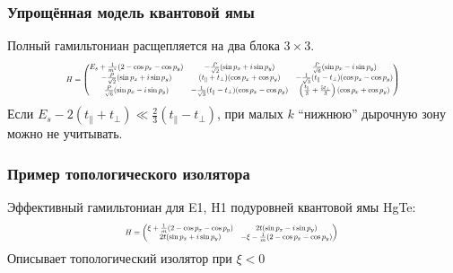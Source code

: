 \documentclass{beamer}
\begin{document}
\begin{frame}
    \frametitle{Упрощённая модель квантовой ямы}
    Полный гамильтониан расщепляется на два блока $3\times 3$.
    \begin{equation}
        \scalebox{0.6}{$
        \label{block}
        H = \begin{pmatrix}
                E_s + \frac{1}{m^*}(2 - \cos{p_x} - \cos{p_y}) &
                -\frac{P}{\sqrt{2}}(\sin{p_x} + i\sin{p_y}) &
                \frac{P}{\sqrt{6}}(\sin{p_x} - i\sin{p_y}) \\
                -\frac{P}{\sqrt{2}}(\sin{p_x} + i\sin{p_y}) &
                (t_\parallel + t_\perp)(\cos{p_x} + \cos{p_y}) &
                -\frac{1}{\sqrt{3}}(t_\parallel - t_\perp)(\cos{p_x} - \cos{p_y}) \\
                \frac{P}{\sqrt{6}}(\sin{p_x} - i\sin{p_y}) &
                -\frac{1}{\sqrt{3}}(t_\parallel - t_\perp)(\cos{p_x} - \cos{p_y}) &
                \left(\frac{t_\parallel}{3} + \frac{5t_\perp}{3}\right)(\cos{p_x} + \cos{p_y})
            \end{pmatrix}
        $}
    \end{equation}
Если $E_s - 2(t_\parallel + t_\perp) \ll \frac{2}{3}(t_\parallel - t_\perp)$,
при малых $k$ ``нижнюю'' дырочную зону можно не учитывать. 
\end{frame}
\begin{frame}
    \frametitle{Пример топологического изолятора}
        Эффективный гамильтониан для E1, H1 подуровней квантовой ямы HgTe:
        \begin{equation}
           \label{eff_so_ham}
            \scalebox{0.6}{%
            $
            H = \left(\begin{matrix}
                    \xi + \frac{1}{m}(2 - \cos{p_x} - \cos{p_y}) & 
                            2t(\sin{p_x} - i\sin{p_y})   \\
                    2t(\sin{p_x} + i\sin{p_y}) & 
                           - \xi - \frac{1}{m}(2 - \cos{p_x} - \cos{p_y}) \\
                \end{matrix}\right)
            $
            }
        \end{equation}
        Описывает топологический изолятор при $\xi < 0$
\end{frame}
\end{document}
